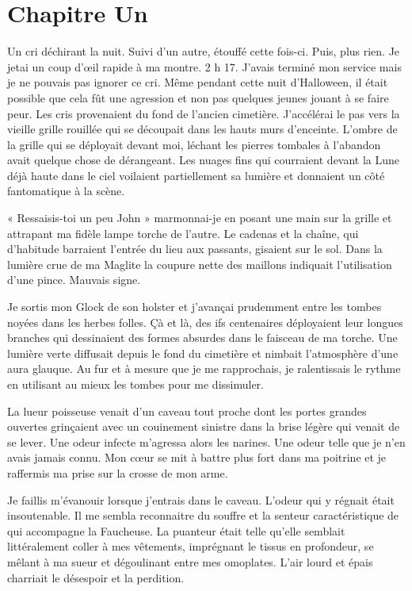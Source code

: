 \chapter[Chapitre Un]{Chapitre Un}
Un cri déchirant la nuit. Suivi d'un autre, étouffé cette fois-ci. Puis, plus rien. Je jetai un coup d'œil rapide à ma 
montre. 2 h 17. J'avais terminé mon service mais je ne pouvais pas ignorer ce cri. Même pendant cette nuit d'Halloween, 
il était possible que cela fût une agression et non pas quelques jeunes jouant à se faire peur. Les cris provenaient du 
fond de l'ancien cimetière. J'accélérai le pas vers la vieille grille rouillée qui se découpait dans les hauts murs 
d'enceinte. L'ombre de la grille qui se déployait devant moi, léchant les pierres tombales à l'abandon avait quelque 
chose de dérangeant. Les nuages fins qui courraient devant la Lune déjà haute dans le ciel voilaient partiellement sa 
lumière et donnaient un côté fantomatique à la scène.

« Ressaisis-toi un peu John » marmonnai-je en posant une main sur la grille et attrapant ma fidèle lampe torche de 
l'autre. Le cadenas et la chaîne, qui d'habitude barraient l'entrée du lieu aux passants, gisaient sur le sol. Dans la 
lumière crue de ma Maglite la coupure nette des maillons indiquait l'utilisation d'une pince. Mauvais signe.

Je sortis mon Glock de son holster et j'avançai prudemment entre les tombes noyées dans les herbes folles. Çà et là, 
des ifs centenaires déployaient leur longues branches qui dessinaient des formes absurdes dans le faisceau de ma 
torche. Une lumière verte diffusait depuis le fond du cimetière et nimbait l'atmosphère d'une aura glauque. Au fur et à 
mesure que je me rapprochais, je ralentissais le rythme en utilisant au mieux les tombes pour me dissimuler.

La lueur poisseuse venait d'un caveau tout proche dont les portes grandes ouvertes grinçaient avec un couinement 
sinistre dans la brise légère qui venait de se lever. Une odeur infecte m'agressa alors les narines. Une odeur telle 
que je n'en avais jamais connu. Mon cœur se mit à battre plus fort dans ma poitrine et je raffermis ma prise sur la 
crosse de mon arme.

Je faillis m'évanouir lorsque j'entrais dans le caveau. L'odeur qui y régnait était insoutenable. Il me sembla 
reconnaitre du souffre et la senteur caractéristique de qui accompagne la Faucheuse. La puanteur était telle qu'elle 
semblait littéralement coller à mes vêtements, imprégnant le tissus en profondeur, se mêlant à ma sueur et dégoulinant 
entre mes omoplates. L'air lourd et épais charriait le désespoir et la perdition.

